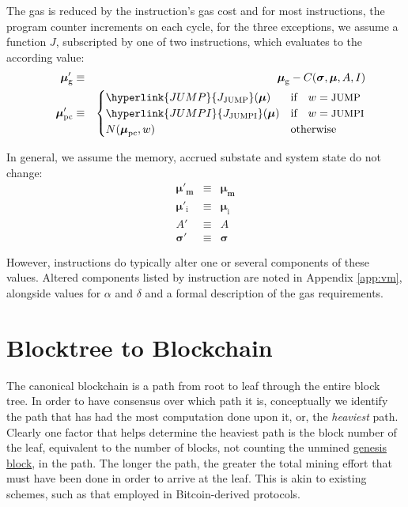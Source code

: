 \documentclass[9pt,oneside]{amsart}
\begin{document}
\begin{multicols}{2}
The gas is reduced by the instruction's gas cost and for most instructions, the program counter increments on each cycle, for the three exceptions, we assume a function $J$, subscripted by one of two instructions, which evaluates to the according value:
\begin{eqnarray}
\quad \boldsymbol{\mu}'_{\mathrm{g}} & \equiv & \boldsymbol{\mu}_{\mathrm{g}} - C(\boldsymbol{\sigma}, \boldsymbol{\mu}, A, I) \label{eq:mu_pc}\\
\quad \boldsymbol{\mu}'_{\mathrm{pc}} & \equiv & \begin{cases}
\hyperlink{JUMP}{J_{\text{JUMP}}}(\boldsymbol{\mu}) & \text{if} \quad w = \text{\small JUMP} \\
\hyperlink{JUMPI}{J_{\text{JUMPI}}}(\boldsymbol{\mu}) & \text{if} \quad w = \text{\small JUMPI} \\
N(\boldsymbol{\mu}_{\mathrm{pc}}, w) & \text{otherwise}
\end{cases}
\end{eqnarray}

In general, we assume the memory, accrued substate and system state do not change:
\begin{eqnarray}
\boldsymbol{\mu}'_{\mathbf{m}} & \equiv & \boldsymbol{\mu}_{\mathbf{m}} \\
\boldsymbol{\mu}'_{\mathrm{i}} & \equiv & \boldsymbol{\mu}_{\mathrm{i}} \\
A' & \equiv & A \\
\boldsymbol{\sigma}' & \equiv & \boldsymbol{\sigma}
\end{eqnarray}

However, instructions do typically alter one or several components of these values. Altered components listed by instruction are noted in Appendix \ref{app:vm}, alongside values for $\alpha$ and $\delta$ and a formal description of the gas requirements.

\section{Blocktree to Blockchain} \label{ch:ghost}

The canonical blockchain is a path from root to leaf through the entire block tree. In order to have consensus over which path it is, conceptually we identify the path that has had the most computation done upon it, or, the \textit{heaviest} path. Clearly one factor that helps determine the heaviest path is the block number of the leaf, equivalent to the number of blocks, not counting the unmined \hyperlink{Genesis_Block}{genesis block}, in the path. The longer the path, the greater the total mining effort that must have been done in order to arrive at the leaf. This is akin to existing schemes, such as that employed in Bitcoin-derived protocols.


\end{multicols}
\end{document}
